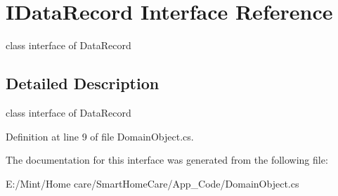 \hypertarget{interface_i_data_record}{\section{I\-Data\-Record Interface Reference}
\label{interface_i_data_record}
}


class interface of Data\-Record  




\subsection{Detailed Description}
class interface of Data\-Record 

Definition at line 9 of file Domain\-Object.\-cs.



The documentation for this interface was generated from the following file\-:\begin{DoxyCompactItemize}
\item 
E\-:/\-Mint/\-Home care/\-Smart\-Home\-Care/\-App\-\_\-\-Code/Domain\-Object.\-cs\end{DoxyCompactItemize}

